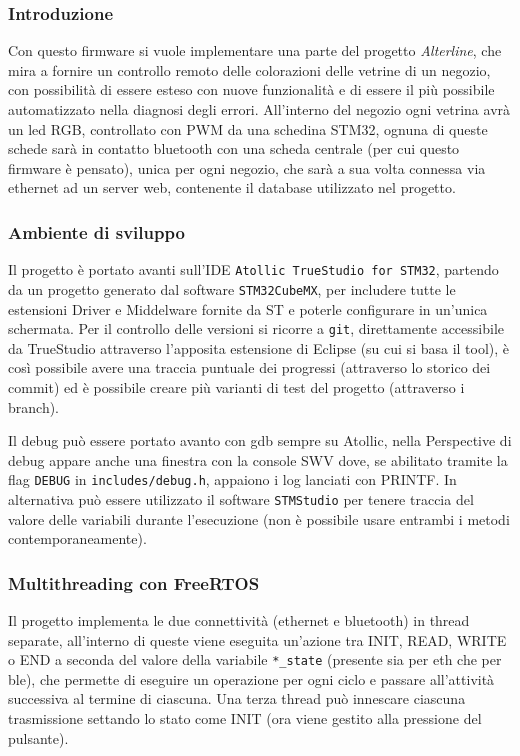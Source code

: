 \subsubsection{Introduzione}

Con questo firmware si vuole implementare una parte del progetto \textit{Alterline}, che mira a fornire un controllo remoto delle colorazioni delle vetrine di un negozio, con possibilit\`a di essere esteso con nuove funzionalit\`a e di essere il pi\`u possibile automatizzato nella diagnosi degli errori. All'interno del negozio ogni vetrina avr\`a un led RGB, controllato con PWM da una schedina STM32, ognuna di queste schede sar\`a in contatto bluetooth con una scheda centrale (per cui questo firmware \`e pensato), unica per ogni negozio, che sar\`a a sua volta connessa via ethernet ad un server web, contenente il database utilizzato nel progetto.

\subsubsection{Ambiente di sviluppo}

Il progetto \`e portato avanti sull'IDE \texttt{Atollic TrueStudio for STM32}, partendo da un progetto generato dal software \texttt{STM32CubeMX}, per includere tutte le estensioni Driver e Middelware fornite da ST e poterle configurare in un'unica schermata. Per il controllo delle versioni si ricorre a \texttt{git}, direttamente accessibile da TrueStudio attraverso l'apposita estensione di Eclipse (su cui si basa il tool), \`e cos\`i possibile avere una traccia puntuale dei progressi (attraverso lo storico dei commit) ed \`e possibile creare pi\`u varianti di test del progetto (attraverso i branch).

Il debug pu\`o essere portato avanto con gdb sempre su Atollic, nella Perspective di debug appare anche una finestra con la console SWV dove, se abilitato tramite la flag \texttt{DEBUG} in \texttt{includes/debug.h}, appaiono i log lanciati con PRINTF. In alternativa pu\`o essere utilizzato il software \texttt{STMStudio} per tenere traccia del valore delle variabili durante l'esecuzione (non \`e possibile usare entrambi i metodi contemporaneamente).

\subsubsection{Multithreading con FreeRTOS}

Il progetto implementa le due connettivit\`a (ethernet e bluetooth) in thread separate, all'interno di queste viene eseguita un'azione tra INIT, READ, WRITE o END a seconda del valore della variabile \texttt{*\_state} (presente sia per eth che per ble), che permette di eseguire un operazione per ogni ciclo e passare all'attivit\`a successiva al termine di ciascuna. Una terza thread pu\`o innescare ciascuna trasmissione settando lo stato come INIT (ora viene gestito alla pressione del pulsante).

